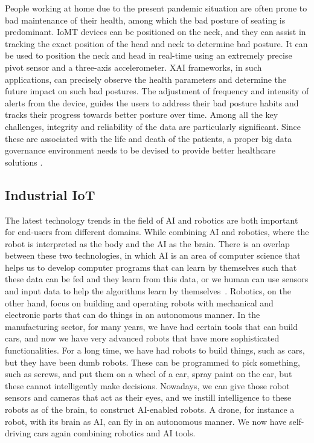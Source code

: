 \documentclass[journal]{IEEEtran}
\begin{document}
People working at home due to the present pandemic situation are often prone to bad maintenance of their health, among which the bad posture of seating is predominant. IoMT devices can be positioned on the neck, and they can assist in tracking the exact position of the head and neck to determine bad posture. It can be used to position the neck and head in real-time using an extremely precise pivot sensor and a three-axis accelerometer. XAI frameworks, in such applications, can precisely observe the health parameters and determine the future impact on such bad postures. The adjustment of frequency and intensity of alerts from the device, guides the users to address their bad posture habits and tracks their progress towards better posture over time. Among all the key challenges, integrity and reliability of the data are particularly significant. Since these are associated with the life and death of the patients, a proper big data governance environment needs to be devised to provide better healthcare solutions \cite{bardhan_predictive_2015}.

\subsection{Industrial IoT}

The latest technology trends in the field of AI and robotics are both important for end-users from different domains. While combining AI and robotics, where the robot is interpreted as the body and the AI as the brain. There is an overlap between these two technologies, in which AI is an area of computer science that helps us to develop computer programs that can learn by themselves such that these data can be fed and they learn from this data, or we human can use sensors and input data to help the algorithms learn by themselves~\cite{malik2021industrial}. Robotics, on the other hand, focus on building and operating robots with mechanical and electronic parts that can do things in an autonomous manner. In the manufacturing sector, for many years, we have had certain tools that can build cars, and now we have very advanced robots that have more sophisticated functionalities. For a long time, we have had robots to build things, such as cars, but they have been dumb robots. These can be programmed to pick something, such as screws, and put them on a wheel of a car, spray paint on the car, but these cannot intelligently make decisions. Nowadays, we can give those robot sensors and cameras that act as their eyes, and we instill intelligence to these robots as of the brain, to construct AI-enabled robots. A drone, for instance a robot, with its brain as AI, can fly in an autonomous manner. We now have self-driving cars again combining robotics and AI tools. 
\end{document}
